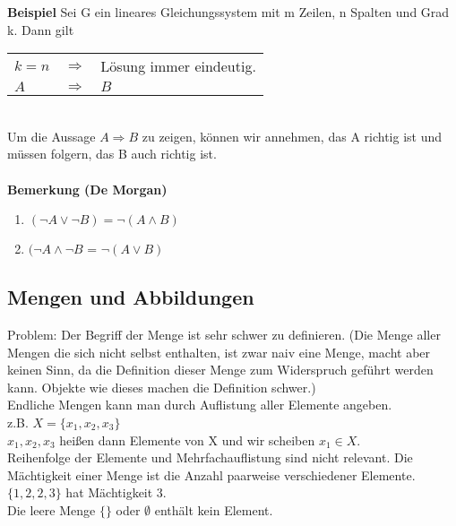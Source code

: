 \documentclass{article}
\begin{document}
\textbf{Beispiel} Sei G ein lineares Gleichungssystem mit m Zeilen, n Spalten und Grad k. Dann gilt \\
\begin{tabular}{l c l}
$k = n$ & $\Rightarrow$ & Lösung immer eindeutig.\\
$A$ & $\Rightarrow$ &  $B$\\
\end{tabular}\\
Um die Aussage $A \Rightarrow B$ zu zeigen, können wir annehmen, das A richtig ist und müssen folgern, das B auch richtig ist.\\
\\
\textbf{Bemerkung (De Morgan)}
\begin{enumerate}
\item{$(\neg A \lor \neg B) = \neg (A \land B)$}
\item{$(\neg A \land \neg B$ = $\neg (A \lor B)$}
\end{enumerate}

\subsection{Mengen und Abbildungen}
Problem: Der Begriff der Menge ist sehr schwer zu definieren. (Die Menge aller Mengen die sich nicht selbst enthalten, ist zwar naiv eine Menge, macht aber keinen Sinn, da die Definition dieser Menge zum Widerspruch geführt werden kann. Objekte wie dieses machen die Definition schwer.)\\
Endliche Mengen kann man durch Auflistung aller Elemente angeben.\\
z.B. $X = \{x_1, x_2, x_3\}$\\
$x_1, x_2, x_3$ hei\ss{}en dann Elemente von X und wir scheiben $x_1 \in X$.\\
Reihenfolge der Elemente und Mehrfachauflistung sind nicht relevant. Die Mächtigkeit einer Menge ist die Anzahl paarweise verschiedener Elemente.\\
$\{1, 2, 2, 3\}$ hat Mächtigkeit 3.\\
Die leere Menge $\{\}$ oder $\emptyset$ enthält kein Element.
\end{document}
